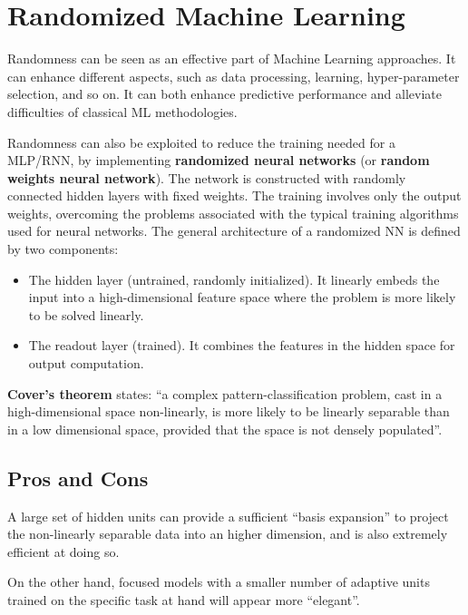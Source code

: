\chapter{Randomized Machine Learning}

Randomness can be seen as an effective part of Machine Learning approaches. It can enhance different aspects, such as data processing, learning, hyper-parameter selection, and so on. It can both enhance predictive performance and alleviate difficulties of classical ML methodologies.

Randomness can also be exploited to reduce the training needed for a MLP/RNN, by implementing \textbf{randomized neural networks} (or \textbf{random weights neural network}). The network is constructed with randomly connected hidden layers with fixed weights. The training involves only the output weights, overcoming the problems associated with the typical training algorithms used for neural networks. The general architecture of a randomized NN is defined by two components:

\begin{itemize}
    \item The hidden layer (untrained, randomly initialized). It linearly embeds the input into a high-dimensional feature space where the problem is more likely to be solved linearly.

    \item The readout layer (trained). It combines the features in the hidden space for output computation.
\end{itemize}

\textbf{Cover's theorem} states: ``a complex pattern-classification problem, cast in a high-dimensional space non-linearly, is more likely to be linearly separable than in a low dimensional space, provided that the space is not densely populated''.

\section{Pros and Cons}

A large set of hidden units can provide a sufficient ``basis expansion'' to project the non-linearly separable data into an higher dimension, and is also extremely efficient at doing so.

On the other hand, focused models with a smaller number of adaptive units trained on the specific task at hand will appear more ``elegant''.